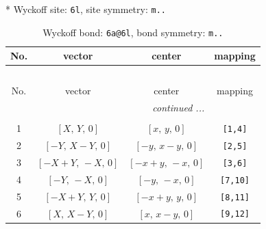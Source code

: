 \documentclass[fleqn,8pt]{jsarticle}
\begin{document}
* Wyckoff site: {\tt 6l}, site symmetry: {\tt m..}
\renewcommand{\arraystretch}{1.2}
\begin{longtable}{cccc}
\caption{Wyckoff bond: {\tt 6a@6l}, bond symmetry: {\tt m..}}
 \\
 \hline \hline
No. & vector & center & mapping \\ \hline \endfirsthead

\multicolumn{3}{l}{\tablename\ \thetable{}} \\
 \hline \hline
No. & vector & center & mapping \\ \hline \endhead

 \hline \hline
\multicolumn{3}{r}{\footnotesize\it continued ...} \\ \endfoot

 \hline \hline
\multicolumn{3}{r}{} \\ \endlastfoot

1 & $\left[ X,\, Y,\, 0 \right]$ & $\left[ x,\, y,\, 0 \right]$ & {\tt [1,4]} \\ \hline
2 & $\left[ - Y,\, X - Y,\, 0 \right]$ & $\left[ - y,\, x - y,\, 0 \right]$ & {\tt [2,5]} \\ \hline
3 & $\left[ - X + Y,\, - X,\, 0 \right]$ & $\left[ - x + y,\, - x,\, 0 \right]$ & {\tt [3,6]} \\ \hline
4 & $\left[ - Y,\, - X,\, 0 \right]$ & $\left[ - y,\, - x,\, 0 \right]$ & {\tt [7,10]} \\ \hline
5 & $\left[ - X + Y,\, Y,\, 0 \right]$ & $\left[ - x + y,\, y,\, 0 \right]$ & {\tt [8,11]} \\ \hline
6 & $\left[ X,\, X - Y,\, 0 \right]$ & $\left[ x,\, x - y,\, 0 \right]$ & {\tt [9,12]} \\
\end{longtable}
\renewcommand{\arraystretch}{1.2}
\end{document}
